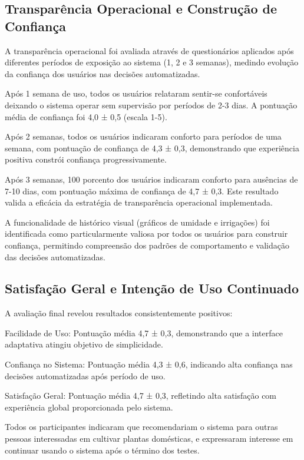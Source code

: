 \documentclass[twoside,english,brazilian]{UNISINOSmonografia}
\begin{document}
\subsection{Transparência Operacional e Construção de Confiança}

A transparência operacional foi avaliada através de questionários aplicados após diferentes períodos de exposição ao sistema (1, 2 e 3 semanas), medindo evolução da confiança dos usuários nas decisões automatizadas.

Após 1 semana de uso, todos os usuários relataram sentir-se confortáveis deixando o sistema operar sem supervisão por períodos de 2-3 dias. A pontuação média de confiança foi 4,0 ± 0,5 (escala 1-5).

Após 2 semanas, todos os usuários indicaram conforto para períodos de uma semana, com pontuação de confiança de 4,3 ± 0,3, demonstrando que experiência positiva constrói confiança progressivamente.

Após 3 semanas, 100 porcento dos usuários indicaram conforto para ausências de 7-10 dias, com pontuação máxima de confiança de 4,7 ± 0,3. Este resultado valida a eficácia da estratégia de transparência operacional implementada.

A funcionalidade de histórico visual (gráficos de umidade e irrigações) foi identificada como particularmente valiosa por todos os usuários para construir confiança, permitindo compreensão dos padrões de comportamento e validação das decisões automatizadas.

\subsection{Satisfação Geral e Intenção de Uso Continuado}

A avaliação final revelou resultados consistentemente positivos:

Facilidade de Uso: Pontuação média 4,7 ± 0,3, demonstrando que a interface adaptativa atingiu objetivo de simplicidade.

Confiança no Sistema: Pontuação média 4,3 ± 0,6, indicando alta confiança nas decisões automatizadas após período de uso.

Satisfação Geral: Pontuação média 4,7 ± 0,3, refletindo alta satisfação com experiência global proporcionada pelo sistema.

Todos os participantes indicaram que recomendariam o sistema para outras pessoas interessadas em cultivar plantas domésticas, e expressaram interesse em continuar usando o sistema após o término dos testes.
\end{document}
